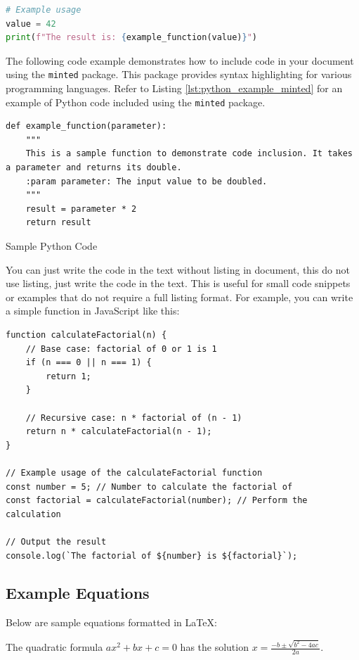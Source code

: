 \documentclass[12pt,a4paper]{report}
\begin{document}
\begin{spacing}{1.5}
\begin{lstlisting}[language=Python, caption=Example Python Code, breaklines=true, label=lst:python_example]
# Example usage
value = 42
print(f"The result is: {example_function(value)}")
\end{lstlisting}
    The following code example demonstrates how to include code in your document using the \texttt{minted} package. This package provides syntax highlighting for various programming languages. Refer to Listing \ref{lst:python_example_minted} for an example of Python code included using the \texttt{minted} package.
    \begin{listing}[H]
        \begin{verbatim}
def example_function(parameter):
    """
    This is a sample function to demonstrate code inclusion. It takes a parameter and returns its double.
    :param parameter: The input value to be doubled.
    """
    result = parameter * 2
    return result
\end{verbatim}
        \caption{Sample Python Code}
        \label{lst:python_example_minted}
    \end{listing}


    You can just write the code in the text without listing in document, this do not use listing, just write the code in the text. This is useful for small code snippets or examples that do not require a full listing format. For example, you can write a simple function in JavaScript like this:
    \begin{verbatim}
function calculateFactorial(n) {
    // Base case: factorial of 0 or 1 is 1
    if (n === 0 || n === 1) {
        return 1;
    }

    // Recursive case: n * factorial of (n - 1)
    return n * calculateFactorial(n - 1);
}

// Example usage of the calculateFactorial function
const number = 5; // Number to calculate the factorial of
const factorial = calculateFactorial(number); // Perform the calculation

// Output the result
console.log(`The factorial of ${number} is ${factorial}`);
\end{verbatim}

    \subsection{Example Equations}
    Below are sample equations formatted in LaTeX:

    The quadratic formula $ax^2 + bx + c = 0$ has the solution $x = \frac{-b \pm \sqrt{b^2 - 4ac}}{2a}$.


\end{spacing}
\end{document}
